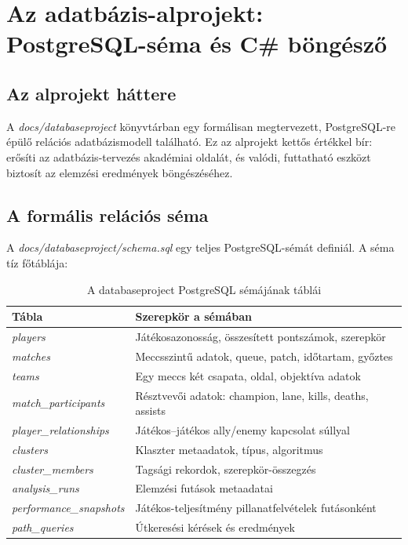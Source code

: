 \chapter{Az adatbázis-alprojekt: PostgreSQL-séma és C\# böngésző}

\section{Az alprojekt háttere}

A \textit{docs/databaseproject} könyvtárban egy formálisan megtervezett, PostgreSQL-re épülő relációs adatbázismodell található. Ez az alprojekt kettős értékkel bír: erősíti az adatbázis-tervezés akadémiai oldalát, és valódi, futtatható eszközt biztosít az elemzési eredmények böngészéséhez.

\section{A formális relációs séma}

A \textit{docs/databaseproject/schema.sql} egy teljes PostgreSQL-sémát definiál. A séma tíz főtáblája:

\begin{table}[H]
\centering
\caption{A databaseproject PostgreSQL sémájának táblái}
\begin{tabularx}{\textwidth}{|>{\raggedright\arraybackslash}p{4.5cm}|X|}
\hline
\textbf{Tábla} & \textbf{Szerepkör a sémában} \\
\hline
\textit{players} & Játékosazonosság, összesített pontszámok, szerepkör \\
\textit{matches} & Meccsszintű adatok, queue, patch, időtartam, győztes \\
\textit{teams} & Egy meccs két csapata, oldal, objektíva adatok \\
\textit{match\_participants} & Résztvevői adatok: champion, lane, kills, deaths, assists \\
\textit{player\_relationships} & Játékos--játékos ally/enemy kapcsolat súllyal \\
\textit{clusters} & Klaszter metaadatok, típus, algoritmus \\
\textit{cluster\_members} & Tagsági rekordok, szerepkör-összegzés \\
\textit{analysis\_runs} & Elemzési futások metaadatai \\
\textit{performance\_snapshots} & Játékos-teljesítmény pillanatfelvételek futásonként \\
\textit{path\_queries} & Útkeresési kérések és eredmények \\
\hline
\end{tabularx}
\end{table}

